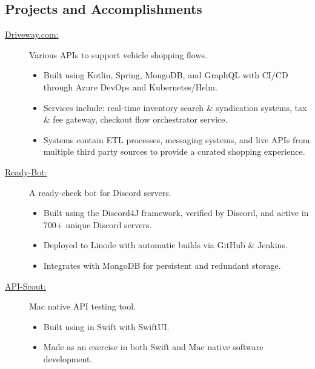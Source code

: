 \documentclass{article}
\def \intraspace {0.1em}
\begin{document}
\subsection*{Projects and Accomplishments}
    \begin{description}

        \item[\href{https://driveway.com/shop}{Driveway.com:\hspace{0.075in}}] Various APIs to support vehicle shopping flows.
            \begin{itemize}
                \item Built using Kotlin, Spring, MongoDB, and GraphQL with CI/CD through Azure DevOps and Kubernetes/Helm.
                \item Services include: real-time inventory search \& syndication systems, tax \& fee gateway, checkout flow orchestrator service.
                \item Systems contain ETL processes, messaging systems, and live APIs from multiple third party sources to provide a curated shopping experience.
            \end{itemize}

            \vspace{\intraspace}
        \item[\href{https://www.github.com/BurnsCommaLucas/ready-botlin}{Ready-Bot:\hspace{0.075in}}] A ready-check bot for Discord servers.
            \begin{itemize}
                \item Built using the Discord4J framework, verified by Discord, and active in 700+ unique Discord servers.
                \item Deployed to Linode with automatic builds via GitHub \& Jenkins.
                \item Integrates with MongoDB for persistent and redundant storage.
            \end{itemize}

            \vspace{\intraspace}

        \item[\href{https://github.com/BurnsCommaLucas/API-Scout}{API-Scout:\hspace{0.075in}}] Mac native API testing tool.
            \begin{itemize}
            	\item Built using in Swift with SwiftUI.
            	\item Made as an exercise in both Swift and Mac native software development.
            \end{itemize}


\end{description}
\end{document}
